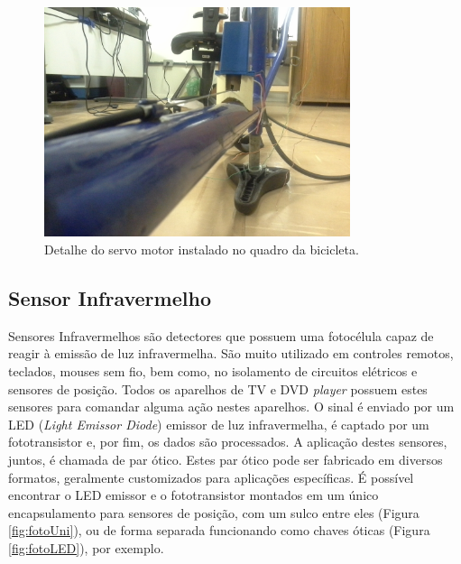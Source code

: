 \begin{figure}[h]
  \centering
	\includegraphics[width=0.8\textwidth]{figuras/servoQuadro.jpg}
  \caption{Detalhe do servo motor instalado no quadro da bicicleta.}
  \label{fig:foto_servo}
\end{figure}

\subsection{Sensor Infravermelho} %
\label{sub:sensor_infra}

Sensores Infravermelhos são detectores que possuem uma fotocélula capaz de reagir à emissão de luz infravermelha. São muito utilizado em controles remotos, teclados, mouses sem fio, bem como, no isolamento de circuitos elétricos e sensores de posição. Todos os aparelhos de TV e DVD \textit{player} possuem estes sensores para comandar alguma ação nestes aparelhos. O sinal é enviado por um LED (\textit{Light Emissor Diode}) emissor de luz infravermelha, é captado por um fototransistor e, por fim, os dados são processados. 
A aplicação destes sensores, juntos, é chamada de par ótico. Estes par ótico pode ser fabricado em diversos formatos, geralmente customizados para aplicações específicas. É possível encontrar o LED emissor e o fototransistor montados em um único encapsulamento para sensores de posição, com um sulco entre eles (Figura \ref{fig:fotoUni}), ou de forma separada funcionando como chaves óticas (Figura \ref{fig:fotoLED}), por exemplo.

